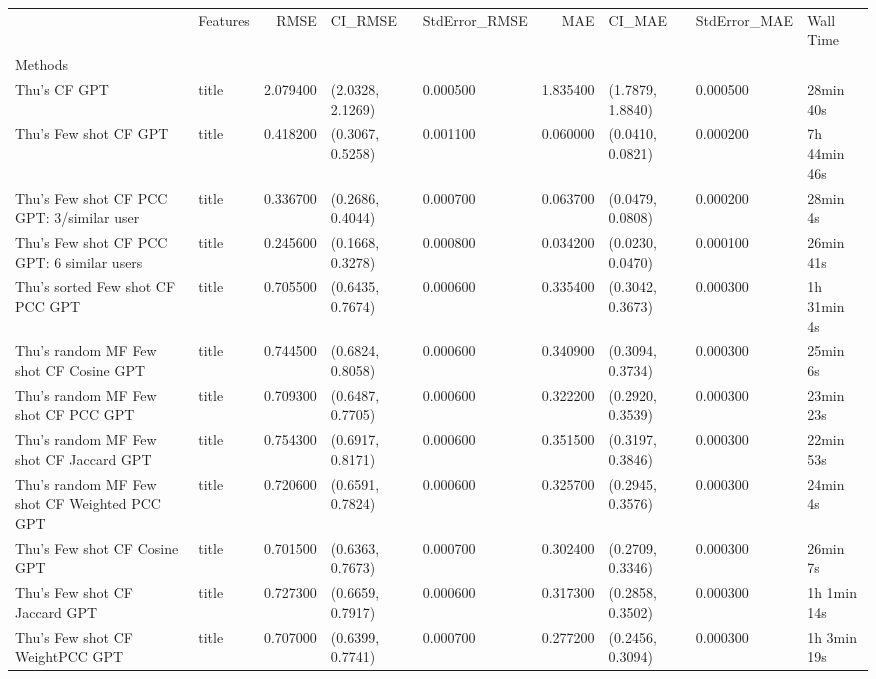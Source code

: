 \begin{tabular}{llrllrlll}
 & Features & RMSE & CI_RMSE & StdError_RMSE & MAE & CI_MAE & StdError_MAE & Wall Time \\
Methods &  &  &  &  &  &  &  &  \\
Thu's CF GPT & title & 2.079400 & (2.0328, 2.1269) & 0.000500 & 1.835400 & (1.7879, 1.8840) & 0.000500 & 28min 40s \\
Thu's Few shot CF GPT & title & 0.418200 & (0.3067, 0.5258) & 0.001100 & 0.060000 & (0.0410, 0.0821) & 0.000200 & 7h 44min 46s \\
Thu's Few shot CF PCC GPT: 3/similar user & title & 0.336700 & (0.2686, 0.4044) & 0.000700 & 0.063700 & (0.0479, 0.0808) & 0.000200 & 28min 4s \\
Thu's Few shot CF PCC GPT: 6 similar users & title & 0.245600 & (0.1668, 0.3278) & 0.000800 & 0.034200 & (0.0230, 0.0470) & 0.000100 & 26min 41s \\
Thu's sorted Few shot CF PCC GPT & title & 0.705500 & (0.6435, 0.7674) & 0.000600 & 0.335400 & (0.3042, 0.3673) & 0.000300 & 1h 31min 4s \\
Thu's random MF Few shot CF Cosine GPT & title & 0.744500 & (0.6824, 0.8058) & 0.000600 & 0.340900 & (0.3094, 0.3734) & 0.000300 & 25min 6s \\
Thu's random MF Few shot CF PCC GPT & title & 0.709300 & (0.6487, 0.7705) & 0.000600 & 0.322200 & (0.2920, 0.3539) & 0.000300 & 23min 23s \\
Thu's random MF Few shot CF Jaccard GPT & title & 0.754300 & (0.6917, 0.8171) & 0.000600 & 0.351500 & (0.3197, 0.3846) & 0.000300 & 22min 53s \\
Thu's random MF Few shot CF Weighted PCC GPT & title & 0.720600 & (0.6591, 0.7824) & 0.000600 & 0.325700 & (0.2945, 0.3576) & 0.000300 & 24min 4s \\
Thu's Few shot CF Cosine GPT & title & 0.701500 & (0.6363, 0.7673) & 0.000700 & 0.302400 & (0.2709, 0.3346) & 0.000300 & 26min 7s \\
Thu's Few shot CF Jaccard GPT & title & 0.727300 & (0.6659, 0.7917) & 0.000600 & 0.317300 & (0.2858, 0.3502) & 0.000300 & 1h 1min 14s \\
Thu's Few shot CF WeightPCC GPT & title & 0.707000 & (0.6399, 0.7741) & 0.000700 & 0.277200 & (0.2456, 0.3094) & 0.000300 & 1h 3min 19s \\
\end{tabular}
